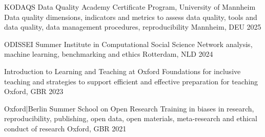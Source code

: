 





\vspace{1mm}

\begin{cvhonors}
\cvhonor
{KODAQS Data Quality Academy Certificate Program, University of Mannheim} 
{Data quality dimensions, indicators and metrics to assess data quality, tools and data quality, data management procedures, reproducibility} 
{Mannheim, DEU}
{2025}
\end{cvhonors}

\vspace{1mm}

\begin{cvhonors}
\cvhonor
{ODISSEI Summer Institute in Computational Social Science} 
{Network analysis, machine learning, benchmarking and ethics} 
{Rotterdam, NLD}
{2024}
\end{cvhonors}

\vspace{1mm}

\begin{cvhonors}
\cvhonor
{Introduction to Learning and Teaching at Oxford} 
{Foundations for inclusive teaching and strategies to support efficient and effective preparation for teaching} 
{Oxford, GBR}
{2023}
\end{cvhonors}

\vspace{1mm}

\begin{cvhonors}
\cvhonor
{Oxford|Berlin Summer School on Open Research} 
{Training in biases in research, reproducibility, publishing, open data, open materials, meta-research and ethical conduct of research} 
{Oxford, GBR}
{2021}
\end{cvhonors}

\vspace{1mm}

